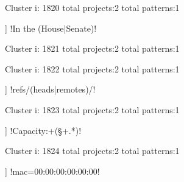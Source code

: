 Cluster i: 1820
total projects:2
total patterns:1
\begin{multicols}{1}
\begin{description}[noitemsep,topsep=0pt]
\item [[2] ] \cverb!In the (House|Senate)!
\end{description}
\end{multicols}







Cluster i: 1821
total projects:2
total patterns:1
\begin{multicols}{1}
\end{multicols}







Cluster i: 1822
total projects:2
total patterns:1
\begin{multicols}{1}
\begin{description}[noitemsep,topsep=0pt]
\item [[2] ] \cverb!refs/(heads|remotes)/!
\end{description}
\end{multicols}







Cluster i: 1823
total projects:2
total patterns:1
\begin{multicols}{1}
\begin{description}[noitemsep,topsep=0pt]
\item [[2] ] \cverb!Capacity:\s+(\S+.*)!
\end{description}
\end{multicols}







Cluster i: 1824
total projects:2
total patterns:1
\begin{multicols}{1}
\begin{description}[noitemsep,topsep=0pt]
\item [[2] ] \cverb!mac=00:00:00:00:00:00!
\end{description}
\end{multicols}







